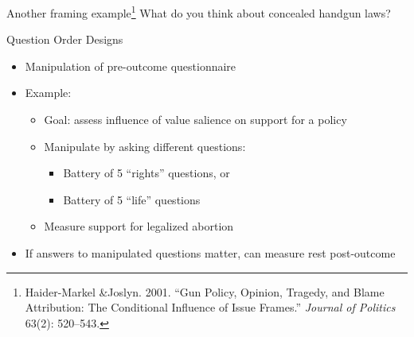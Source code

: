\documentclass[
  ignorenonframetext,
]{beamer}
\begin{document}
\begin{frame}{\normalsize Another framing
example\footnote{Haider-Markel \&Joslyn. 2001. ``Gun Policy, Opinion, Tragedy, and Blame Attribution: The Conditional Influence of Issue Frames.'' \textit{Journal of Politics} 63(2): 520--543.}}
\protect\hypertarget{another-framing-example-2}{}
What do you think about concealed handgun laws?
\end{frame}

\begin{frame}{\normalsize Question Order Designs}
\protect\hypertarget{question-order-designs}{}
\small

\begin{itemize}
\item Manipulation of pre-outcome questionnaire
\item<2-> Example:
    \begin{itemize}
    \item Goal: assess influence of value salience on support for a policy
    \item Manipulate by asking different questions:
        \begin{itemize}
        \item Battery of 5 ``rights'' questions, or
        \item Battery of 5 ``life'' questions
        \end{itemize}
    \item Measure support for legalized abortion
    \end{itemize}
\item<3-> If answers to manipulated questions matter, can measure rest post-outcome
\end{itemize}
\end{frame}
\end{document}
